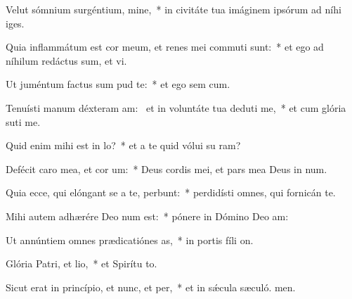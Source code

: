 \item Velut sómnium surgéntium, mine,~* in civitáte tua imáginem ipsórum ad níhi iges.
\item Quia inflammátum est cor meum, et renes mei commuti sunt:~* et ego ad níhilum redáctus sum, et vi.
\item Ut juméntum factus sum pud te:~* et ego sem cum.
\item Tenuísti manum déxteram am:~\pscross{} et in voluntáte tua deduti me,~* et cum glória suti me.
\item Quid enim mihi est in lo?~* et a te quid vólui su ram?
\item Defécit caro mea, et cor um:~* Deus cordis mei, et pars mea Deus in num.
\item Quia ecce, qui elóngant se a te, perbunt:~* perdidísti omnes, qui fornicán  te.
\item Mihi autem adhærére Deo num est:~* pónere in Dómino Deo  am:
\item Ut annúntiem omnes prædicatiónes as,~* in portis fíli on.
\item Glória Patri, et lio,~* et Spirítu to.
\item Sicut erat in princípio, et nunc, et per,~* et in sǽcula sæculó. men.
